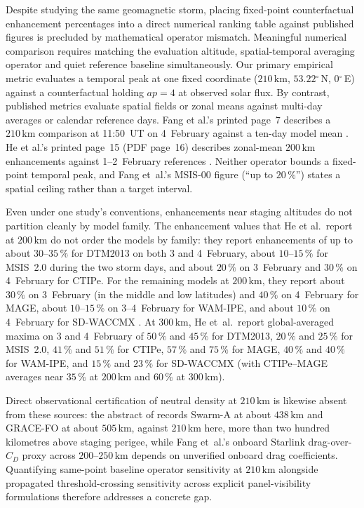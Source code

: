 \documentclass[12pt]{article}
\newcommand{\unit}[1]{\,\mathrm{#1}}
\newcommand{\degree}{\ensuremath{{}^\circ}}
\begin{document}
Despite studying the same geomagnetic storm, placing fixed-point counterfactual enhancement percentages into a direct numerical ranking table against published figures is precluded by mathematical operator mismatch. Meaningful numerical comparison requires matching the evaluation altitude, spatial-temporal averaging operator and quiet reference baseline simultaneously. Our primary empirical metric evaluates a temporal peak at one fixed coordinate ($210\unit{km}$, $53.22\degree$\,N, $0\degree$\,E) against a counterfactual holding $ap=4$ at observed solar flux. By contrast, published metrics evaluate spatial fields or zonal means against multi-day averages or calendar reference days. Fang et al.'s printed page~7 describes a $210\unit{km}$ comparison at 11:50~UT on 4~February against a ten-day model mean \citep{fang2022}. He et al.'s printed page~15 (PDF page~16) describes zonal-mean $200\unit{km}$ enhancements against 1--2~February references \citep{he2023}. Neither operator bounds a fixed-point temporal peak, and Fang et~al.'s MSIS-00 figure (``up to $20\,\%$'') states a spatial ceiling rather than a target interval.

Even under one study's conventions, enhancements near staging altitudes do not partition cleanly by model family. The enhancement values that He et al.\ report at $200\unit{km}$ do not order the models by family: they report enhancements of up to about $30$--$35\,\%$ for DTM2013 on both 3 and 4~February, about $10$--$15\,\%$ for MSIS~2.0 during the two storm days, and about $20\,\%$ on 3~February and $30\,\%$ on 4~February for CTIPe. For the remaining models at $200\unit{km}$, they report about $30\,\%$ on 3~February (in the middle and low latitudes) and $40\,\%$ on 4~February for MAGE, about $10$--$15\,\%$ on 3--4~February for WAM-IPE, and about $10\,\%$ on 4~February for SD-WACCMX \citep[p.~15]{he2023}. At $300\unit{km}$, He et~al.\ report global-averaged maxima on 3 and 4~February of $50\,\%$ and $45\,\%$ for DTM2013, $20\,\%$ and $25\,\%$ for MSIS~2.0, $41\,\%$ and $51\,\%$ for CTIPe, $57\,\%$ and $75\,\%$ for MAGE, $40\,\%$ and $40\,\%$ for WAM-IPE, and $15\,\%$ and $23\,\%$ for SD-WACCMX (with CTIPe--MAGE averages near $35\,\%$ at $200\unit{km}$ and $60\,\%$ at $300\unit{km}$).

Direct observational certification of neutral density at $210\unit{km}$ is likewise absent from these sources: the abstract of \citet{he2023} records Swarm-A at about
$438\unit{km}$ and GRACE-FO at about $505\unit{km}$, against $210\unit{km}$ here, more than two hundred kilometres above staging perigee, while Fang et~al.'s onboard Starlink drag-over-$C_D$ proxy across $200$--$250\unit{km}$ depends on unverified onboard drag coefficients. Quantifying same-point baseline operator sensitivity at $210\unit{km}$ alongside propagated threshold-crossing sensitivity across explicit panel-visibility formulations therefore addresses a concrete gap.
\end{document}

